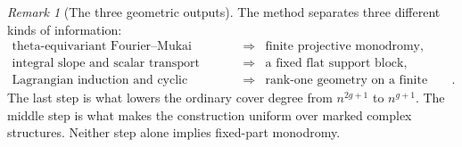 \documentclass[11pt,reqno]{amsart}
\numberwithin{equation}{section}
\theoremstyle{remark}
\newtheorem{remark}[remark]{Remark}
\begin{document}
\begin{remark}[The three geometric outputs]\label{rem:three-outputs}
The method separates three different kinds of information:
\[
 \begin{array}{ccl}
 \text{theta-equivariant Fourier--Mukai splitting}
   &\Longrightarrow&\text{finite projective monodromy},\\
 \text{integral slope and scalar transport}
   &\Longrightarrow&\text{a fixed flat support block},\\
 \text{Lagrangian induction and cyclic untwisting}
   &\Longrightarrow&\text{rank-one geometry on a finite cover}.
 \end{array}
\tag{9.3}\label{eq:three-outputs}
\]
The last step is what lowers the ordinary cover degree from
\(n^{2g+1}\) to \(n^{g+1}\).  The middle step is what makes the
construction uniform over marked complex structures.  Neither step
alone implies fixed-part monodromy.
\end{remark}
\end{document}
